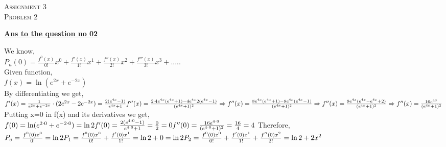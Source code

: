 \documentclass{article}
\begin{document}
\begin{newpage}
    \begin{flushright}
    \textsc{Assignment 3}\\
    \textsc{Problem 2}\\
    [0.5 cm]
    \end{flushright}
\begin{center}
  \textbf{\Large \underline {Ans to the question no 02}}\\
  [0.5 cm]
\end{center}
\Large {We know,\\[3mm]
$P_{n}(0)=\frac{f^0(x)}{0!}x^0+\frac{f'(x)}{1!}x^1+\frac{f''(x)}{2!}x^2+\frac{f'''(x)}{3!}x^3+.....$\\[3mm]
Given function, \\[2mm]
$f(x) = \ln(e^{2x} + e^{-2x})$\\[3mm]
By differentiating we get,\\[2mm]
$f'(x) = \frac{1}{e^{2x} + e^{-2x}}\cdot(2{e^{2x}}-2e^{-2x})=\frac{2(e^{4x}-1)}{e^{4x}+1}\\[3mm]
f''(x)=\frac{2\cdot4e^{4x}(e^{4x}+1)-4e^{4x}2(e^{4x}-1)}{(e^{4x}+1)^2}\\[3mm]
\Rightarrow f''(x)=\frac{8e^{4x}(e^{4x}+1)-8e^{4x}(e^{4x}-1)}{(e^{4x}+1)^2}\\[3mm] 
\Rightarrow f''(x)=\frac{8e^{4x}(e^{4x}-e^{4x}+2)}{(e^{4x}+1)^2}\\[3mm]
\Rightarrow f''(x)=\frac{16e^{4x}}{(e^{4x}+1)^2}\\[3mm]$
Putting x=0 in f(x) and its derivatives we get,\\[3mm]
$f(0) = \ln (e^{2\cdot0} + e^{-2\cdot0})=\ln2\\[3mm]
f'(0) =\frac{2(e^{4\cdot0}-1)}{e^{4\cdot0}+1}=\frac{0}{2}=0\\[3mm]
f''(0)=\frac{16e^{4\cdot0}}{(e^{4\cdot0}+1)^2}=\frac{16}{4}=4\\[3mm]$
Therefore,\\[3mm]
$P_{o}=\frac{f^0(0)x^0}{0!}=\ln2 \\[3mm]
P_{1}=\frac{f^0(0)x^0}{0!}+\frac{f'(0)x^1}{1!}=\ln2+0=\ln2\\[3mm]
P_{2}=\frac{f^0(0)x^0}{0!}+\frac{f'(0)x^1}{1!}+\frac{f''(0)x^2}{2!}=\ln2+2x^2$}
\end{newpage}
\end{document}
